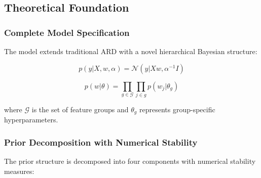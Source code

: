 \subsection{Theoretical Foundation}

\subsubsection{Complete Model Specification}

The model extends traditional ARD with a novel hierarchical Bayesian structure:

\[
p(y|X,w,\alpha) = \mathcal{N}(y|Xw,\alpha^{-1}I)
\]

\[
p(w|\theta) = \prod_{g \in \mathcal{G}} \prod_{j \in g} p(w_j|\theta_g)
\]

where $\mathcal{G}$ is the set of feature groups and $\theta_g$ represents group-specific hyperparameters. 

\subsubsection{Prior Decomposition with Numerical Stability}

The prior structure is decomposed into four components with numerical stability measures: 

